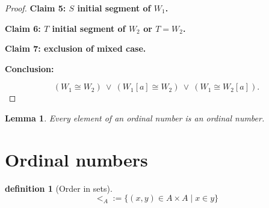\documentclass[10pt,a4paper]{book}
\newtheorem{definition}{definition}[section]
\newtheorem{lemma}{Lemma}[section]
\begin{document}
\begin{proof}
    \textbf{Claim 5: $S$ initial segment of $W_1$.}

    \begin{fitchproof}[arrayenv=tabular]

         
         
         

    \end{fitchproof}

    \textbf{Claim 6: $T$ initial segment of $W_2$ or $T=W_2$.}

    \begin{fitchproof}[arrayenv=tabular]

         
         
         

    \end{fitchproof}

    \textbf{Claim 7: exclusion of mixed case.}

    \begin{fitchproof}[arrayenv=tabular]

         
         
         
         
         
         

    \end{fitchproof}

    \textbf{Conclusion:}

    \[
        (W_1\cong W_2)\ \lor\ (W_1[a]\cong W_2)\ \lor\ (W_1\cong W_2[a]).
    \]

\end{proof}

\begin{lemma}
    Every element of an ordinal number is an ordinal number.
\end{lemma}

\section{Ordinal numbers}

\begin{definition}
    [Order in sets]

    \[
        <_A := \{ (x,y) \in A \times A  \mid x \in y \}
    \]
\end{definition}
\end{document}
